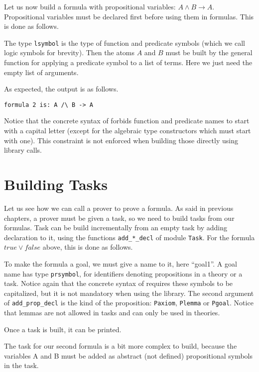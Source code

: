 Let us now build a formula with propositional variables: $A \land B
\rightarrow A$. Propositional variables must be declared first before
using them in formulas. This is done as follows.

The type \texttt{lsymbol} is the type of function and predicate symbols (which
we call logic symbols for brevity). Then the atoms $A$ and $B$ must be built
by the general function for applying a predicate symbol to a list of terms.
Here we just need the empty list of arguments.


As expected, the output is as follows.
\begin{verbatim}
formula 2 is: A /\ B -> A
\end{verbatim}
Notice that the concrete syntax of \why forbids function and predicate
names to start with a capital letter (except for the algebraic type
constructors which must start with one). This constraint is not enforced
when building those directly using library calls.

\section{Building Tasks}

Let us see how we can call a prover to prove a formula. As said in
previous chapters, a prover must be given a task, so we need to build
tasks from our formulas. Task can be build incrementally from an empty
task by adding declaration to it, using the functions
\texttt{add\_*\_decl} of module \texttt{Task}. For the formula $\mathit{true} \lor
\mathit{false}$ above, this is done as follows.

To make the formula a goal, we must give a name to it, here ``goal1''. A
goal name has type \texttt{prsymbol}, for identifiers denoting
propositions in a theory or a task. Notice again that the concrete
syntax of \why requires these symbols to be capitalized, but it is not
mandatory when using the library. The second argument of
\texttt{add\_prop\_decl} is the kind of the proposition:
\texttt{Paxiom}, \texttt{Plemma} or \texttt{Pgoal}.
Notice that lemmas are not allowed in tasks
and can only be used in theories.

Once a task is built, it can be printed.


The task for our second formula is a bit more complex to build, because
the variables A and B must be added as abstract (\ie not defined)
propositional symbols in the task.


